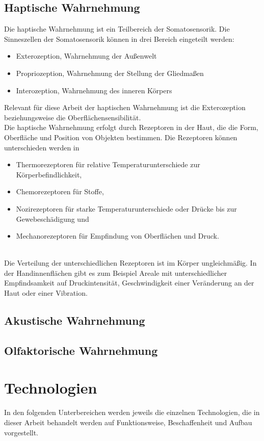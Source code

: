 \subsection{Haptische Wahrnehmung}
Die haptische Wahrnehmung ist ein Teilbereich der Somatosensorik. Die Sinneszellen der Somatosensorik können in drei Bereich eingeteilt werden:
\begin{itemize}
	\item Exterozeption, Wahrnehmung der Außenwelt
	\item Propriozeption, Wahrnehmung der Stellung der Gliedmaßen
	\item Interozeption, Wahrnehmung des inneren Körpers
\end{itemize}
Relevant für diese Arbeit der haptischen Wahrnehmung ist die Exterozeption beziehungsweise die Oberflächensensibilität. \cite[Vgl. Seite 26]{Sprenger.2020}\\
Die haptische Wahrnehmung erfolgt durch Rezeptoren in der Haut, die die Form, Oberfläche und Position von Objekten bestimmen. Die Rezeptoren können unterschieden werden in
\begin{itemize}
	\item Thermorezeptoren für relative Temperaturunterschiede zur Körperbefindlichkeit, 
	\item Chemorezeptoren für Stoffe,
	\item Nozirezeptoren für starke Temperaturunterschiede oder Drücke bis zur Gewebeschädigung und
	\item Mechanorezeptoren für Empfindung von Oberflächen und Druck.
\end{itemize}
\cite[Vgl. Seite 26f]{Sprenger.2020}\\
Die Verteilung der unterschiedlichen Rezeptoren ist im Körper ungleichmäßig. In der Handinnenflächen gibt es zum Beispiel Areale mit unterschiedlicher Empfindsamkeit \glqq auf Druckintensität, Geschwindigkeit einer Veränderung an der Haut oder einer Vibration. \grqq \cite[Seite 29]{Sprenger.2020}
\subsection{Akustische Wahrnehmung}
\subsection{Olfaktorische Wahrnehmung}
\section{Technologien}
In den folgenden Unterbereichen werden jeweils die einzelnen Technologien, die in dieser Arbeit behandelt werden auf Funktionsweise, Beschaffenheit und Aufbau vorgestellt.
